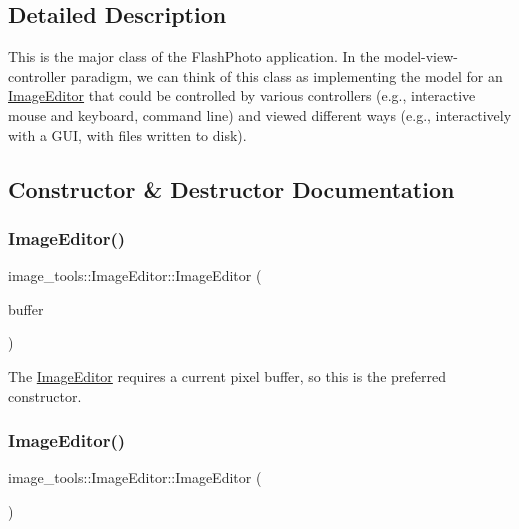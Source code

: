 \subsection{Detailed Description}
This is the major class of the Flash\+Photo application. In the model-\/view-\/controller paradigm, we can think of this class as implementing the model for an \hyperlink{classimage__tools_1_1ImageEditor}{Image\+Editor} that could be controlled by various controllers (e.\+g., interactive mouse and keyboard, command line) and viewed different ways (e.\+g., interactively with a G\+UI, with files written to disk). 

\subsection{Constructor \& Destructor Documentation}
\mbox{\label{classimage__tools_1_1ImageEditor_ae2c556649a8961a0ff7caf5058a6c12c}} 
\subsubsection{\texorpdfstring{Image\+Editor()}{ImageEditor()}\hspace{0.1cm}{\footnotesize\ttfamily [1/2]}}
{\footnotesize\ttfamily image\+\_\+tools\+::\+Image\+Editor\+::\+Image\+Editor (\begin{DoxyParamCaption}\item[{\hyperlink{classimage__tools_1_1PixelBuffer}{Pixel\+Buffer} $\ast$}]{buffer }\end{DoxyParamCaption})\hspace{0.3cm}{\ttfamily [explicit]}}

The \hyperlink{classimage__tools_1_1ImageEditor}{Image\+Editor} requires a current pixel buffer, so this is the preferred constructor. \mbox{\label{classimage__tools_1_1ImageEditor_a7665987647451a161e28b918436d0d10}} 
\subsubsection{\texorpdfstring{Image\+Editor()}{ImageEditor()}\hspace{0.1cm}{\footnotesize\ttfamily [2/2]}}
{\footnotesize\ttfamily image\+\_\+tools\+::\+Image\+Editor\+::\+Image\+Editor (\begin{DoxyParamCaption}{ }\end{DoxyParamCaption})}

